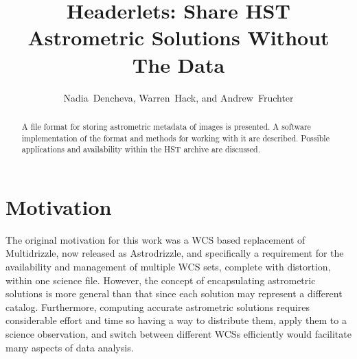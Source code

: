 
\resetcounters




\title{Headerlets: Share HST Astrometric Solutions Without The Data}
\author{Nadia~Dencheva, Warren~Hack, and Andrew~Fruchter
}


\begin{abstract}
A file format for storing astrometric metadata of images is presented. A software implementation of the format and methods for working with it are described. Possible applications and availability within the HST archive are discussed.
\end{abstract}

\section{Motivation}
The original motivation for this work was a WCS based replacement of Multidrizzle, now released as Astrodrizzle, and specifically a requirement for the availability and management of multiple WCS sets, complete with distortion, within one science file. However, the concept of encapsulating astrometric solutions is more general than that since each solution may represent a different catalog. Furthermore, computing accurate astrometric solutions requires considerable effort and time so having a way to distribute them, apply them to a science observation, and switch between different WCSs efficiently would facilitate many aspects of data analysis.

